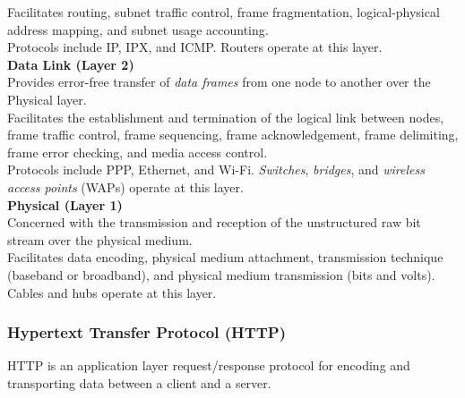 \documentclass[12pt, titlepage]{article}
\begin{document}
Facilitates routing, subnet traffic control, frame fragmentation, logical-physical address mapping, and subnet usage accounting. \\

Protocols include IP, IPX, and ICMP. Routers operate at this layer. \\

\textbf{Data Link (Layer 2)} \\

Provides error-free transfer of \textit{data frames} from one node to another over the Physical layer. \\

Facilitates the establishment and termination of the logical link between nodes, frame traffic control, frame sequencing, frame acknowledgement, frame delimiting, frame error checking, and media access control. \\

Protocols include PPP, Ethernet, and Wi-Fi. \textit{Switches}, \textit{bridges}, and \textit{wireless access points} (WAPs) operate at this layer. \\

\textbf{Physical (Layer 1)} \\

Concerned with the transmission and reception of the unstructured raw bit stream over the physical medium. \\

Facilitates data encoding, physical medium attachment, transmission technique (baseband or broadband), and physical medium transmission (bits and volts). \\

Cables and hubs operate at this layer. \\

\subsubsection{Hypertext Transfer Protocol (HTTP)}

HTTP is an application layer request/response protocol for encoding and transporting data between a client and a server.
\end{document}
